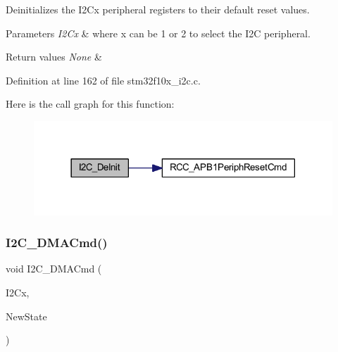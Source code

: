 Deinitializes the I2\+Cx peripheral registers to their default reset values. 


\begin{DoxyParams}{Parameters}
{\em I2\+Cx} & where x can be 1 or 2 to select the I2C peripheral. \\
\hline
\end{DoxyParams}

\begin{DoxyRetVals}{Return values}
{\em None} & \\
\hline
\end{DoxyRetVals}


Definition at line 162 of file stm32f10x\+\_\+i2c.\+c.

Here is the call graph for this function\+:
\nopagebreak
\begin{figure}[H]
\begin{center}
\leavevmode
\includegraphics[width=318pt]{group___i2_c___exported___functions_ga2ee214364603059ad5d9089f749f5bfd_cgraph}
\end{center}
\end{figure}
\mbox{\label{group___i2_c___exported___functions_ga38502ce11e5ec923e0f6476aaa35b45c}} 
\subsubsection{\texorpdfstring{I2\+C\+\_\+\+D\+M\+A\+Cmd()}{I2C\_DMACmd()}}
{\footnotesize\ttfamily void I2\+C\+\_\+\+D\+M\+A\+Cmd (\begin{DoxyParamCaption}\item[{\hyperlink{struct_i2_c___type_def}{I2\+C\+\_\+\+Type\+Def} $\ast$}]{I2\+Cx,  }\item[{\hyperlink{group___exported__types_gac9a7e9a35d2513ec15c3b537aaa4fba1}{Functional\+State}}]{New\+State }\end{DoxyParamCaption})}



